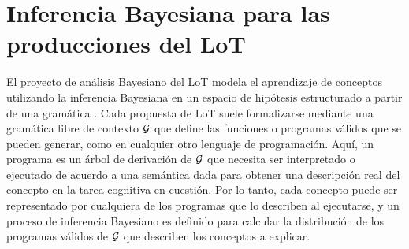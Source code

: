 \section{Inferencia Bayesiana para las producciones del LoT}


El proyecto de análisis Bayesiano del LoT modela el aprendizaje de conceptos utilizando la inferencia Bayesiana en un espacio de hipótesis estructurado a partir de una gramática \cite{goodman2008rational}. Cada propuesta de LoT suele formalizarse mediante una gramática libre de contexto $\gram$ que define las funciones o programas válidos que se pueden generar, como en cualquier otro lenguaje de programación. Aquí, un programa es un árbol de derivación de $\gram$ que necesita ser interpretado o ejecutado de acuerdo a una semántica dada para obtener una descripción real del concepto en la tarea cognitiva en cuestión. Por lo tanto, cada concepto puede ser representado por cualquiera de los programas que lo describen al ejecutarse, y un proceso de inferencia Bayesiano es definido para calcular la distribución de los programas válidos de $\gram$ que describen los conceptos a explicar.

